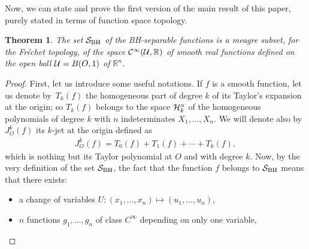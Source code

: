 \documentclass[10pt,a4paper]{amsart}
\numberwithin{equation}{section}
\newtheorem{Theorem}{Theorem}[section]
\begin{document}
Now, we can state and prove the first version of the main result of this paper, purely stated in terms of function space topology.


\begin{Theorem}\label{mainthm}	
	The set ${\cal S}_{\rm BH}$ of the BH-separable functions is a meagre subset, for the Fr\'echet topology, of the space ${\cal C}^{\infty}({\cal U},\mathbb{R})$ of smooth real functions defined on the open ball ${\cal U}=B(O,1)$ of $\mathbb{R}^n$.
	
\end{Theorem}

\begin{proof} First, let us introduce some useful notations. If $f$ is a smooth function, let us denote by~$T_k(f)$ the homogeneous part of degree $k$ of its Taylor's expansion at the origin; so $T_k(f)$ belongs to the space ${\cal H}_k^n$ of the homogeneous polynomials of degree $k$ with $n$ indeterminates $X_1,\dots,X_n$. We will denote also by $J_O^k(f)$ its $k$-jet at the origin defined as
\begin{gather*}J_O^k(f)=T_0(f)+T_1(f)+\cdots+T_k(f),\end{gather*}
	which is nothing but its Taylor polynomial at $O$ and with degree $k$.
	Now, by the very definition of the set ${\cal S}_{\rm BH}$, the fact that the function $f$ belongs to ${\cal S}_{\rm BH}$ means that there exists:
\begin{itemize}\itemsep=0pt
\item a change of variables $U \colon (x_1, \dots, x_n)\mapsto (u_1, \dots, u_n)$,
	
\item $n$ functions $g_1, \dots, g_n$ of class $C^\infty$ depending on only one variable,
	

\end{itemize}
\end{proof}
\end{document}
